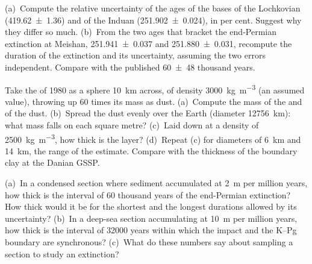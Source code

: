 \begin{exercise}[$\star\star$]\label{exo:b1:stratigraphic-scale:7}
(a)~Compute the relative uncertainty of the ages of the bases of the Lochkovian
(\qty[uncertainty-mode=separate]{419.62(136)}{\Ma}) and of the Induan (\qty[uncertainty-mode=separate]{251.902(24)}{\Ma}), in per
cent. Suggest why they differ so much. (b)~From the two ages that bracket the
end-Permian extinction at Meishan, \qty[uncertainty-mode=separate]{251.941(37)}{\Ma} and
\qty[uncertainty-mode=separate]{251.880(31)}{\Ma}, recompute the duration of the extinction and its
uncertainty, assuming the two errors independent. Compare with the published
\num[uncertainty-mode=separate]{60 \pm 48} thousand years.
\end{exercise}

\begin{exercise}[$\star\star$]\label{exo:b1:stratigraphic-scale:8}
Take the  of 1980 as a sphere \qty{10}{km} across, of density
\qty{3000}{kg.m^{-3}} (an assumed value), throwing up 60 times its mass as dust.
(a)~Compute the mass of the  and of the dust. (b)~Spread the dust evenly
over the Earth (diameter \qty{12756}{km}): what mass falls on each square metre?
(c)~Laid down at a density of \qty{2500}{kg.m^{-3}}, how thick is the layer?
(d)~Repeat (c) for diameters of \qty{6}{km} and \qty{14}{km}, the range of the
estimate. Compare with the thickness of the boundary clay at the Danian GSSP.
\end{exercise}

\begin{exercise}[$\star\star$]\label{exo:b1:stratigraphic-scale:9}
(a)~In a condensed section where sediment accumulated at \qty{2}{m} per million
years, how thick is the interval of \num{60} thousand years of the end-Permian
extinction? How thick would it be for the shortest and the longest durations
allowed by its uncertainty? (b)~In a deep-sea section accumulating at
\qty{10}{m} per million years, how thick is the interval of \num{32000} years
within which the impact and the K--Pg boundary are synchronous? (c)~What do
these numbers say about sampling a section to study an extinction?
\end{exercise}

